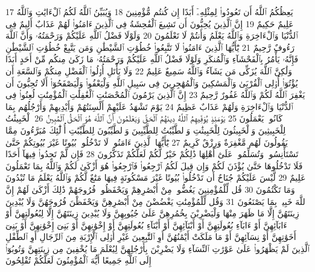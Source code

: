 {\tiny\colorbox{cl_aya}{17}} يَعِظُكُمُ ٱللَّهُ أَن تَعُودُوا۟ لِمِثْلِهِۦٓ أَبَدًا إِن كُنتُم مُّؤْمِنِينَ
{\tiny\colorbox{cl_aya}{18}} وَيُبَيِّنُ ٱللَّهُ لَكُمُ ٱلْءَايَٰتِ وَٱللَّهُ عَلِيمٌ حَكِيمٌ
{\tiny\colorbox{cl_aya}{19}} إِنَّ ٱلَّذِينَ يُحِبُّونَ أَن تَشِيعَ ٱلْفَٰحِشَةُ فِى ٱلَّذِينَ ءَامَنُوا۟ لَهُمْ عَذَابٌ أَلِيمٌ فِى ٱلدُّنْيَا وَٱلْءَاخِرَةِ وَٱللَّهُ يَعْلَمُ وَأَنتُمْ لَا تَعْلَمُونَ
{\tiny\colorbox{cl_aya}{20}} وَلَوْلَا فَضْلُ ٱللَّهِ عَلَيْكُمْ وَرَحْمَتُهُۥ وَأَنَّ ٱللَّهَ رَءُوفٌ رَّحِيمٌ
{\tiny\colorbox{cl_aya}{21}} يَٰٓأَيُّهَا ٱلَّذِينَ ءَامَنُوا۟ لَا تَتَّبِعُوا۟ خُطُوَٰتِ ٱلشَّيْطَٰنِ وَمَن يَتَّبِعْ خُطُوَٰتِ ٱلشَّيْطَٰنِ فَإِنَّهُۥ يَأْمُرُ بِٱلْفَحْشَآءِ وَٱلْمُنكَرِ وَلَوْلَا فَضْلُ ٱللَّهِ عَلَيْكُمْ وَرَحْمَتُهُۥ مَا زَكَىٰ مِنكُم مِّنْ أَحَدٍ أَبَدًا وَلَٰكِنَّ ٱللَّهَ يُزَكِّى مَن يَشَآءُ وَٱللَّهُ سَمِيعٌ عَلِيمٌ
{\tiny\colorbox{cl_aya}{22}} وَلَا يَأْتَلِ أُو۟لُوا۟ ٱلْفَضْلِ مِنكُمْ وَٱلسَّعَةِ أَن يُؤْتُوٓا۟ أُو۟لِى ٱلْقُرْبَىٰ وَٱلْمَسَٰكِينَ وَٱلْمُهَٰجِرِينَ فِى سَبِيلِ ٱللَّهِ وَلْيَعْفُوا۟ وَلْيَصْفَحُوٓا۟ أَلَا تُحِبُّونَ أَن يَغْفِرَ ٱللَّهُ لَكُمْ وَٱللَّهُ غَفُورٌ رَّحِيمٌ
{\tiny\colorbox{cl_aya}{23}} إِنَّ ٱلَّذِينَ يَرْمُونَ ٱلْمُحْصَنَٰتِ ٱلْغَٰفِلَٰتِ ٱلْمُؤْمِنَٰتِ لُعِنُوا۟ فِى ٱلدُّنْيَا وَٱلْءَاخِرَةِ وَلَهُمْ عَذَابٌ عَظِيمٌ
{\tiny\colorbox{cl_aya}{24}} يَوْمَ تَشْهَدُ عَلَيْهِمْ أَلْسِنَتُهُمْ وَأَيْدِيهِمْ وَأَرْجُلُهُم بِمَا كَانُوا۟ يَعْمَلُونَ
{\tiny\colorbox{cl_aya}{25}} يَوْمَئِذٍ يُوَفِّيهِمُ ٱللَّهُ دِينَهُمُ ٱلْحَقَّ وَيَعْلَمُونَ أَنَّ ٱللَّهَ هُوَ ٱلْحَقُّ ٱلْمُبِينُ
{\tiny\colorbox{cl_aya}{26}} ٱلْخَبِيثَٰتُ لِلْخَبِيثِينَ وَٱلْخَبِيثُونَ لِلْخَبِيثَٰتِ وَٱلطَّيِّبَٰتُ لِلطَّيِّبِينَ وَٱلطَّيِّبُونَ لِلطَّيِّبَٰتِ أُو۟لَٰٓئِكَ مُبَرَّءُونَ مِمَّا يَقُولُونَ لَهُم مَّغْفِرَةٌ وَرِزْقٌ كَرِيمٌ
{\tiny\colorbox{cl_aya}{27}} يَٰٓأَيُّهَا ٱلَّذِينَ ءَامَنُوا۟ لَا تَدْخُلُوا۟ بُيُوتًا غَيْرَ بُيُوتِكُمْ حَتَّىٰ تَسْتَأْنِسُوا۟ وَتُسَلِّمُوا۟ عَلَىٰٓ أَهْلِهَا ذَٰلِكُمْ خَيْرٌ لَّكُمْ لَعَلَّكُمْ تَذَكَّرُونَ
{\tiny\colorbox{cl_aya}{28}} فَإِن لَّمْ تَجِدُوا۟ فِيهَآ أَحَدًا فَلَا تَدْخُلُوهَا حَتَّىٰ يُؤْذَنَ لَكُمْ وَإِن قِيلَ لَكُمُ ٱرْجِعُوا۟ فَٱرْجِعُوا۟ هُوَ أَزْكَىٰ لَكُمْ وَٱللَّهُ بِمَا تَعْمَلُونَ عَلِيمٌ
{\tiny\colorbox{cl_aya}{29}} لَّيْسَ عَلَيْكُمْ جُنَاحٌ أَن تَدْخُلُوا۟ بُيُوتًا غَيْرَ مَسْكُونَةٍ فِيهَا مَتَٰعٌ لَّكُمْ وَٱللَّهُ يَعْلَمُ مَا تُبْدُونَ وَمَا تَكْتُمُونَ
{\tiny\colorbox{cl_aya}{30}} قُل لِّلْمُؤْمِنِينَ يَغُضُّوا۟ مِنْ أَبْصَٰرِهِمْ وَيَحْفَظُوا۟ فُرُوجَهُمْ ذَٰلِكَ أَزْكَىٰ لَهُمْ إِنَّ ٱللَّهَ خَبِيرٌۢ بِمَا يَصْنَعُونَ
{\tiny\colorbox{cl_aya}{31}} وَقُل لِّلْمُؤْمِنَٰتِ يَغْضُضْنَ مِنْ أَبْصَٰرِهِنَّ وَيَحْفَظْنَ فُرُوجَهُنَّ وَلَا يُبْدِينَ زِينَتَهُنَّ إِلَّا مَا ظَهَرَ مِنْهَا وَلْيَضْرِبْنَ بِخُمُرِهِنَّ عَلَىٰ جُيُوبِهِنَّ وَلَا يُبْدِينَ زِينَتَهُنَّ إِلَّا لِبُعُولَتِهِنَّ أَوْ ءَابَآئِهِنَّ أَوْ ءَابَآءِ بُعُولَتِهِنَّ أَوْ أَبْنَآئِهِنَّ أَوْ أَبْنَآءِ بُعُولَتِهِنَّ أَوْ إِخْوَٰنِهِنَّ أَوْ بَنِىٓ إِخْوَٰنِهِنَّ أَوْ بَنِىٓ أَخَوَٰتِهِنَّ أَوْ نِسَآئِهِنَّ أَوْ مَا مَلَكَتْ أَيْمَٰنُهُنَّ أَوِ ٱلتَّٰبِعِينَ غَيْرِ أُو۟لِى ٱلْإِرْبَةِ مِنَ ٱلرِّجَالِ أَوِ ٱلطِّفْلِ ٱلَّذِينَ لَمْ يَظْهَرُوا۟ عَلَىٰ عَوْرَٰتِ ٱلنِّسَآءِ وَلَا يَضْرِبْنَ بِأَرْجُلِهِنَّ لِيُعْلَمَ مَا يُخْفِينَ مِن زِينَتِهِنَّ وَتُوبُوٓا۟ إِلَى ٱللَّهِ جَمِيعًا أَيُّهَ ٱلْمُؤْمِنُونَ لَعَلَّكُمْ تُفْلِحُونَ

